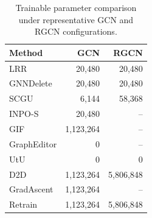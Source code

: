 \begin{table}

\centering

\footnotesize

\caption{Trainable parameter comparison under representative GCN and RGCN configurations.}\label{tab:params}

\setlength{\tabcolsep}{3.5pt}

\begin{tabular*}{\columnwidth}{@{\extracolsep{\fill}}lrr}

\toprule

Method & GCN & RGCN \\

\midrule

LRR & 20,480 & 20,480 \\

GNNDelete & 20,480 & 20,480 \\

SCGU & 6,144 & 58,368 \\

INPO-S & 20,480 & -- \\

GIF & 1,123,264 & -- \\

GraphEditor & 0 & -- \\

UtU & 0 & 0 \\

D2D & 1,123,264 & 5,806,848 \\

GradAscent & 1,123,264 & -- \\

Retrain & 1,123,264 & 5,806,848 \\

\bottomrule

\end{tabular*}

\end{table}

